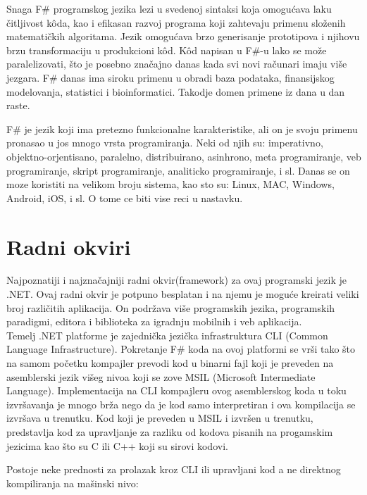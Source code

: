 \documentclass[a4paper]{article}
\begin{document}
Snaga F\# programskog jezika lezi u svedenoj sintaksi koja omogućava laku čitljivost kôda, kao i efikasan razvoj programa koji zahtevaju primenu složenih matematičkih algoritama. Jezik omogućava brzo generisanje prototipova i njihovu brzu transformaciju u produkcioni kôd. Kôd napisan u F\#-u lako se može paralelizovati, što je posebno značajno danas kada svi novi računari imaju više jezgara. F\# danas ima siroku primenu u obradi baza podataka, finansijskog modelovanja, statistici i bioinformatici. Takodje domen primene iz dana u dan raste.

F\# je jezik koji ima pretezno funkcionalne karakteristike, ali on je svoju primenu pronasao u jos mnogo vrsta programiranja. Neki od njih su: imperativno, objektno-orjentisano, paralelno, distribuirano, asinhrono, meta programiranje, veb programiranje, skript programiranje, analiticko programiranje, i sl. Danas se on moze koristiti na velikom broju sistema, kao sto su: Linux, MAC, Windows, Android, iOS, i sl. O tome ce biti vise reci u nastavku. 



\section{Radni okviri}

Najpoznatiji i najznačajniji radni okvir(framework) za ovaj programski jezik je .NET. Ovaj radni okvir je potpuno besplatan i na njemu je moguće kreirati veliki broj različitih aplikacija. On podržava više programskih jezika, programskih paradigmi, editora i biblioteka za igradnju mobilnih i veb aplikacija. 
\\

Temelj .NET platforme je zajednička jezička infrastruktura CLI (Common Language Infrastructure). Pokretanje F\# koda na ovoj platformi se vrši tako što na samom početku kompajler prevodi kod u binarni fajl koji je preveden na asemblerski jezik višeg nivoa koji se zove MSIL (Microsoft Intermediate Language). Implementacija na CLI kompajleru ovog asemblerskog koda u toku izvršavanja je mnogo brža nego da je kod samo interpretiran i ova kompilacija se izvršava u trenutku\cite{progFs}.
Kod koji je preveden u MSIL i izvršen u trenutku, predstavlja kod za upravljanje za razliku od kodova pisanih na progamskim jezicima kao što su C ili C++ koji su sirovi kodovi.   

Postoje neke prednosti za prolazak kroz CLI ili upravljani kod a ne direktnog kompiliranja na mašinski nivo:	
\\
\end{document}
